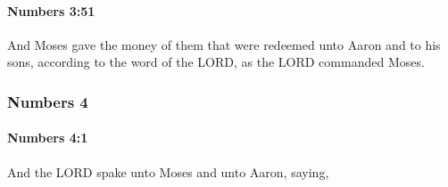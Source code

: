 		\paragraph{Numbers 3:51} %
			\label{NUMBERS-3-51}

			And Moses gave the money of them that were redeemed unto Aaron and to his sons, according to the word of the LORD, as the LORD commanded Moses.

	\subsubsection{Numbers 4} %
		\label{NUMBERS-4}

		\paragraph{Numbers 4:1} %
			\label{NUMBERS-4-1}

			And the LORD spake unto Moses and unto Aaron, saying,

